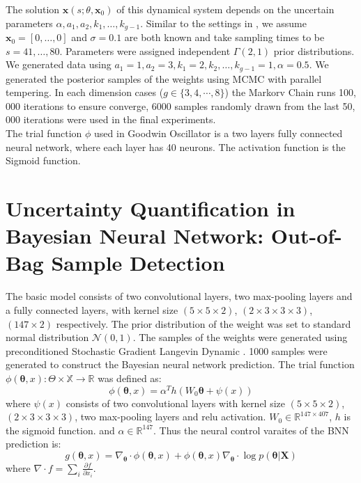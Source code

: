 \documentclass[runningheads]{llncs}
\begin{document}
The solution $\bm{x}(s; \theta, \bm{x}_0)$ of this dynamical system depends on the uncertain parameters $\alpha, a_1, a_2, k_1,\dots, k_{g-1}$. Similar to the settings in \cite{oates2016controlled}, we assume $\bm{x}_0 = [0, \dots, 0]$ and $\sigma = 0.1$ are both known and take sampling times to be $s = 41,\dots,80$. Parameters were assigned independent $\Gamma(2, 1)$ prior distributions. We generated data using $a_1 = 1, a_2 = 3, k_1 = 2, k_2, \dots ,k_{g-1} = 1, \alpha = 0.5$. We generated the posterior samples of the weights using MCMC with parallel tempering. In each dimension cases ($g \in \{3, 4, \cdots, 8\}$) the Markorv Chain runs 100, 000 iterations to ensure converge, 6000 samples randomly drawn from the last 50, 000 iterations were used in the final experiments. \\

The trial function $\phi$ used in Goodwin Oscillator is a two layers fully connected neural network, where each layer has 40 neurons. The activation function is the Sigmoid function. 

\section{Uncertainty Quantification in Bayesian Neural Network: Out-of-Bag Sample Detection}
The basic model consists of two convolutional layers, two max-pooling layers and a fully connected layers, with kernel size $(5 \times 5 \times 2)$, $(2\times 3\times 3 \times 3)$, $(147 \times 2)$ respectively. The prior distribution of the weight was set to standard normal distribution $\mathcal{N}(0, 1)$. The samples of the weights were generated using preconditioned Stochastic Gradient Langevin Dynamic \cite{li2016preconditioned}. 1000 samples were generated to construct the Bayesian neural network prediction. The trial function $\phi(\bm{\theta}, x): \Theta \times \mathbb{X} \longrightarrow \mathbb{R}$ was defined as:
\begin{equation}
    \phi(\bm{\theta}, x) = \alpha^T h(W_0\bm{\theta} + \psi(x))
\end{equation}
where $\psi(x)$ consists of two convolutional layers with kernel size $(5 \times 5 \times 2)$, $(2\times 3\times 3 \times 3)$, two max-pooling layers and relu activation. $W_0 \in \mathbb{R}^{147 \times 407}$, $h$ is the sigmoid function. and $\alpha \in \mathbb{R}^{147}$. Thus the neural control varaites of the BNN prediction is:
\begin{equation}
   g(\bm{\theta}, x) =   \nabla_{\bm{\theta}} \cdot \phi(\bm{\theta}, x) +  \phi(\bm{\theta}, x) \nabla_{\bm{\theta}} \cdot \log p(\bm{\theta} | \bm{X})
\end{equation}
where $\nabla \cdot f = \sum_{i} \frac{\partial f}{\partial x_i}$.
\end{document}
